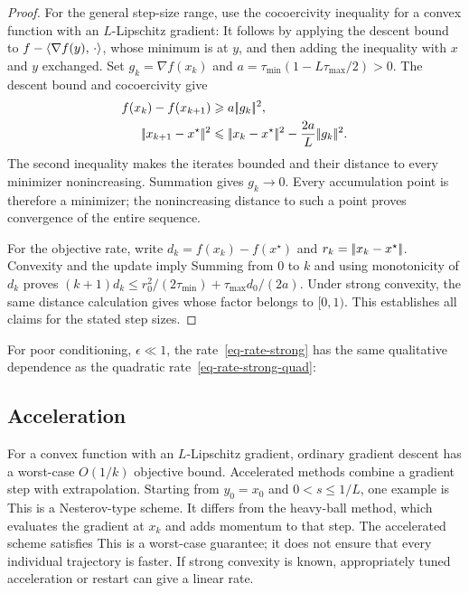 \begin{proof}
For the general step-size range, use the cocoercivity inequality for a convex function with an $L$-Lipschitz gradient:
It follows by applying the descent bound to $f-\langle \nabla f(y),\,\cdot\rangle$, whose minimum is at $y$, and then adding the inequality with $x$ and $y$ exchanged. Set $g_k=\nabla f(x_k)$ and $a=\tau_{\min}(1-L\tau_{\max}/2)>0$. The descent bound and cocoercivity give
\begin{align*}
f(x_k)-f(x_{k+1})&\geq a\norm{g_k}^2,\\
\norm{x_{k+1}-x^\star}^2&\leq\norm{x_k-x^\star}^2-\frac{2a}{L}\norm{g_k}^2.
\end{align*}
The second inequality makes the iterates bounded and their distance to every minimizer nonincreasing. Summation gives $g_k\to0$. Every accumulation point is therefore a minimizer; the nonincreasing distance to such a point proves convergence of the entire sequence.

For the objective rate, write $d_k=f(x_k)-f(x^\star)$ and $r_k=|\!| x_k-x^\star |\!|$. Convexity and the update imply
Summing from $0$ to $k$ and using monotonicity of $d_k$ proves
$(k+1)d_k\leq r_0^2/(2\tau_{\min})+\tau_{\max}d_0/(2a)$.
Under strong convexity, the same distance calculation gives
whose factor belongs to $[0,1)$. This establishes all claims for the stated step sizes.
\end{proof}

For poor conditioning, $\epsilon \ll 1$, the rate~\eqref{eq-rate-strong} has the same qualitative dependence as the quadratic rate~\eqref{eq-rate-strong-quad}:


\subsection{Acceleration}

For a convex function with an $L$-Lipschitz gradient, ordinary gradient descent has a worst-case $O(1/k)$ objective bound. Accelerated methods combine a gradient step with extrapolation. Starting from $y_0=x_0$ and $0<s\leq1/L$, one example is
This is a Nesterov-type scheme. It differs from the heavy-ball method, which evaluates the gradient at $x_k$ and adds momentum to that step. The accelerated scheme satisfies
This is a worst-case guarantee; it does not ensure that every individual trajectory is faster. If strong convexity is known, appropriately tuned acceleration or restart can give a linear rate.

